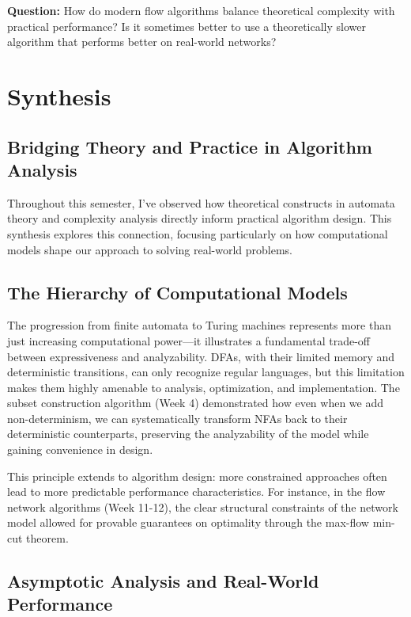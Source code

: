 \documentclass{article}
\theoremstyle{theorem}
\theoremstyle{definition}
\theoremstyle{remark}
\begin{document}
\textbf{Question:} How do modern flow algorithms balance theoretical complexity with practical performance? Is it sometimes better to use a theoretically slower algorithm that performs better on real-world networks?







\section{Synthesis}

\subsection{Bridging Theory and Practice in Algorithm Analysis}

Throughout this semester, I've observed how theoretical constructs in automata theory and complexity analysis directly inform practical algorithm design. This synthesis explores this connection, focusing particularly on how computational models shape our approach to solving real-world problems.

\subsection{The Hierarchy of Computational Models}

The progression from finite automata to Turing machines represents more than just increasing computational power—it illustrates a fundamental trade-off between expressiveness and analyzability. DFAs, with their limited memory and deterministic transitions, can only recognize regular languages, but this limitation makes them highly amenable to analysis, optimization, and implementation. The subset construction algorithm (Week 4) demonstrated how even when we add non-determinism, we can systematically transform NFAs back to their deterministic counterparts, preserving the analyzability of the model while gaining convenience in design.

This principle extends to algorithm design: more constrained approaches often lead to more predictable performance characteristics. For instance, in the flow network algorithms (Week 11-12), the clear structural constraints of the network model allowed for provable guarantees on optimality through the max-flow min-cut theorem.

\subsection{Asymptotic Analysis and Real-World Performance}
\end{document}
